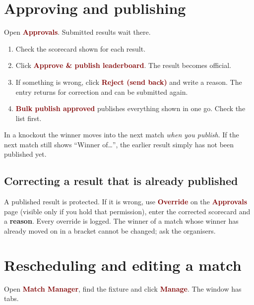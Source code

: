 \documentclass[11pt,a4paper]{article}
\newcommand{\ui}[1]{\textbf{\textcolor{maroon}{#1}}}
\begin{document}
\section{Approving and publishing}
\label{sec:approvals}

Open \ui{Approvals}. Submitted results wait there.

\begin{enumerate}
  \item Check the scorecard shown for each result.
  \item Click \ui{Approve \& publish leaderboard}. The result becomes official.
  \item If something is wrong, click \ui{Reject (send back)} and write a reason. The entry returns for correction and can be submitted again.
  \item \ui{Bulk publish approved} publishes everything shown in one go. Check the list first.
\end{enumerate}

\begin{tip}
In a knockout the winner moves into the next match \emph{when you publish}. If the next match still shows ``Winner of\ldots'',
the earlier result simply has not been published yet.
\end{tip}

\subsection{Correcting a result that is already published}
A published result is protected. If it is wrong, use \ui{Override} on the \ui{Approvals} page (visible only if you hold that permission),
enter the corrected scorecard and a \textbf{reason}. Every override is logged.
The winner of a match whose winner has already moved on in a bracket cannot be changed; ask the organisers.

\section{Rescheduling and editing a match}

Open \ui{Match Manager}, find the fixture and click \ui{Manage}. The window has tabs.
\end{document}
